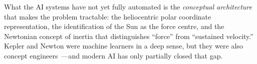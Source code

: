 \documentclass[12pt]{article}
\begin{document}
What the AI systems have not yet fully automated is the \emph{conceptual
architecture} that makes the problem tractable: the heliocentric polar
coordinate representation, the identification of the Sun as the force
centre, and the Newtonian concept of inertia that distinguishes
``force'' from ``sustained velocity.''
Kepler and Newton were machine learners in a deep sense, but they were also
concept engineers~---and modern AI has only partially closed that gap.

\bigskip



\end{document}

